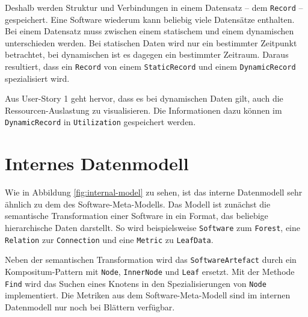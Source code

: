 Deshalb werden Struktur und Verbindungen in einem Datensatz -- dem \texttt{Record} -- gespeichert. Eine Software wiederum kann beliebig viele Datensätze enthalten. Bei einem Datensatz muss zwischen einem statischem und einem dynamischen unterschieden werden. Bei statischen Daten wird nur ein bestimmter Zeitpunkt betrachtet, bei dynamischen ist es dagegen ein bestimmter Zeitraum. Daraus resultiert, dass ein \texttt{Record} von einem \texttt{StaticRecord} und einem \texttt{DynamicRecord} spezialisiert wird.

Aus User-Story 1 geht hervor, dass es bei dynamischen Daten gilt, auch die Ressourcen-Auslastung zu visualisieren. Die Informationen dazu können im \texttt{DynamicRecord} in \texttt{Utilization} gespeichert werden.

\section{Internes Datenmodell}
\label{sec:app-model}

Wie in Abbildung \ref{fig:internal-model} zu sehen, ist das interne Datenmodell sehr ähnlich zu dem des Software-Meta-Modells. Das Modell ist zunächst die semantische Transformation einer Software in ein Format, das beliebige hierarchische Daten darstellt. So wird beispielsweise \texttt{Software} zum \texttt{Forest}, eine \texttt{Relation} zur \texttt{Connection} und eine \texttt{Metric} zu \texttt{LeafData}.

Neben der semantischen Transformation wird das \texttt{SoftwareArtefact} durch ein Kompositum-Pattern mit \texttt{Node}, \texttt{InnerNode} und \texttt{Leaf} ersetzt. Mit der Methode \texttt{Find} wird das Suchen eines Knotens in den Spezialisierungen von \texttt{Node} implementiert. Die Metriken aus dem Software-Meta-Modell sind im internen Datenmodell nur noch bei Blättern verfügbar.

